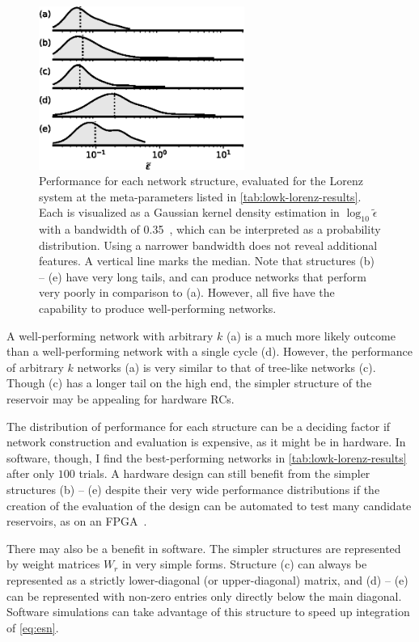 \begin{figure}
  \includegraphics[width=0.6\textwidth]{figures/epsilon-distribution}
  \caption{Performance for each network structure, evaluated for the
    Lorenz system at the meta-parameters listed in
    \cref{tab:lowk-lorenz-results}. Each is visualized as a Gaussian
    kernel density estimation in $\log_{10} \tilde{\epsilon}$ with a bandwidth
    of 0.35~\cite{scott1992}, which can be interpreted as a probability
    distribution. Using a narrower bandwidth does not reveal
    additional features. A vertical line marks the median.  Note that
    structures (b) -- (e) have very long tails, and can produce
    networks that perform very poorly in comparison to (a). However,
    all five have the capability to produce well-performing
    networks.}%
  \label{fig:epsilon-distribution}
\end{figure}

A well-performing network with arbitrary $k$ (a) is a much more
likely outcome than a well-performing network with a single cycle
(d). However, the performance of arbitrary $k$ networks (a) is very
similar to that of tree-like networks (c). Though (c) has a longer
tail on the high end, the simpler structure of the reservoir may be
appealing for hardware RCs.

The distribution of performance for each structure can be a deciding
factor if network construction and evaluation is expensive, as it
might be in hardware. In software, though, I find the
best-performing networks in \cref{tab:lowk-lorenz-results} after only $100$
trials. A hardware design can still benefit from the simpler
structures (b) -- (e) despite their very wide performance distributions
if the creation of the evaluation of the design can be automated to
test many candidate reservoirs, as on an FPGA~\cite{canaday2018}.

There may also be a benefit in software. The simpler structures are
represented by weight matrices $W_r$ in very simple forms. Structure
(c) can always be represented as a strictly lower-diagonal (or upper-diagonal) matrix, and
(d) -- (e) can be represented with non-zero entries only directly below
the main diagonal. Software simulations can take advantage of this structure to
speed up integration of \cref{eq:esn}.

